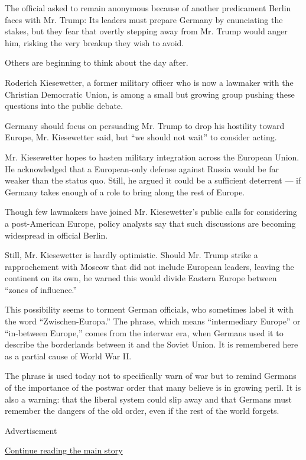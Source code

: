 The official asked to remain anonymous because of another predicament
Berlin faces with Mr. Trump: Its leaders must prepare Germany by
enunciating the stakes, but they fear that overtly stepping away from
Mr. Trump would anger him, risking the very breakup they wish to avoid.

Others are beginning to think about the day after.

Roderich Kiesewetter, a former military officer who is now a lawmaker
with the Christian Democratic Union, is among a small but growing group
pushing these questions into the public debate.

Germany should focus on persuading Mr. Trump to drop his hostility
toward Europe, Mr. Kiesewetter said, but ``we should not wait'' to
consider acting.

Mr. Kiesewetter hopes to hasten military integration across the European
Union. He acknowledged that a European-only defense against Russia would
be far weaker than the status quo. Still, he argued it could be a
sufficient deterrent --- if Germany takes enough of a role to bring
along the rest of Europe.

Though few lawmakers have joined Mr. Kiesewetter's public calls for
considering a post-American Europe, policy analysts say that such
discussions are becoming widespread in official Berlin.

Still, Mr. Kiesewetter is hardly optimistic. Should Mr. Trump strike a
rapprochement with Moscow that did not include European leaders, leaving
the continent on its own, he warned this would divide Eastern Europe
between ``zones of influence.''

This possibility seems to torment German officials, who sometimes label
it with the word ``Zwischen-Europa.'' The phrase, which means
``intermediary Europe'' or ``in-between Europe,'' comes from the
interwar era, when Germans used it to describe the borderlands between
it and the Soviet Union. It is remembered here as a partial cause of
World War II.

The phrase is used today not to specifically warn of war but to remind
Germans of the importance of the postwar order that many believe is in
growing peril. It is also a warning: that the liberal system could slip
away and that Germans must remember the dangers of the old order, even
if the rest of the world forgets.

Advertisement

\protect\hyperlink{after-bottom}{Continue reading the main story}

